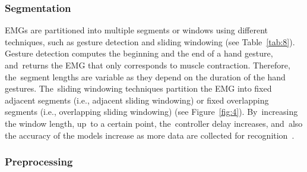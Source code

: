 \documentclass[sensors,review,accept,moreauthors,pdftex]{Definitions/mdpi}
\begin{document}
 





\subsubsection{Segmentation} \label{seg}

EMGs are partitioned into multiple segments or windows using different techniques, such as gesture detection and sliding windowing (see Table~\ref{tab:8}). Gesture detection computes the beginning and the end of a hand gesture, and~returns the EMG that only corresponds to muscle contraction. Therefore, the~segment lengths are variable as they depend on the duration of the hand gestures. The~sliding windowing techniques partition the EMG into fixed adjacent segments (i.e., adjacent sliding windowing) or fixed overlapping segments (i.e., overlapping sliding windowing) (see Figure~\ref{fig:4}). By~increasing the window length, up~to a certain point, the~controller delay increases, and~also the accuracy of the models increase as more data are collected for recognition~\cite{AsghariOskoei2007,Englehart2001}.




\subsubsection{Preprocessing} \label{pre}
\end{document}
